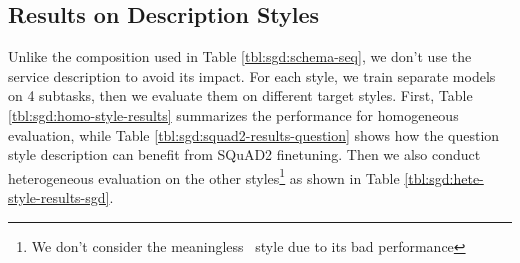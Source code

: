 %

\subsection{Results on Description Styles}
\label{ssec:desc-experiments}
Unlike the composition used in Table \ref{tbl:sgd:schema-seq}, we don't
use the service description to avoid its impact. For each style, we
train separate models on 4 subtasks, then we evaluate them on
different target styles. First, Table \ref{tbl:sgd:homo-style-results}
summarizes the performance for homogeneous evaluation, while Table
\ref{tbl:sgd:squad2-results-question} shows how the question style
description can benefit from SQuAD2 finetuning. Then we also conduct
heterogeneous evaluation on the other styles\footnote{We don't consider
  the meaningless \ID~style due to its bad performance} as shown in
Table \ref{tbl:sgd:hete-style-results-sgd}.
%
